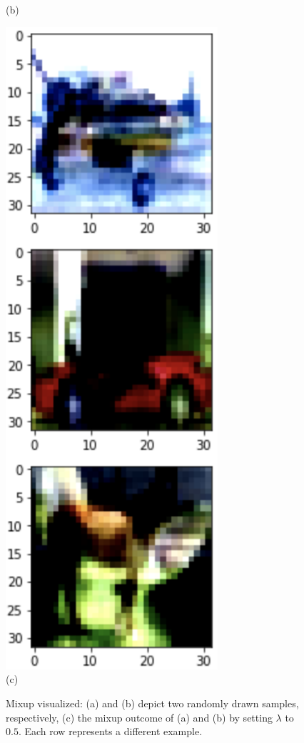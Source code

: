 \begin{figure}[ht]
\begin{minipage}{.25\columnwidth}
        (b)
    \end{minipage}
    \begin{minipage}{.25\columnwidth}
        \centering
        \includegraphics[width=0.7\textwidth]{figures/3.png} \\
        (c)
    \end{minipage}

    \caption{Mixup visualized: (a) and (b) depict two randomly drawn samples, respectively, (c) the mixup outcome of (a) and (b) by setting $\lambda$ to $0.5$. Each row represents a different example.}
    \label{fig:visualization}
\end{figure}